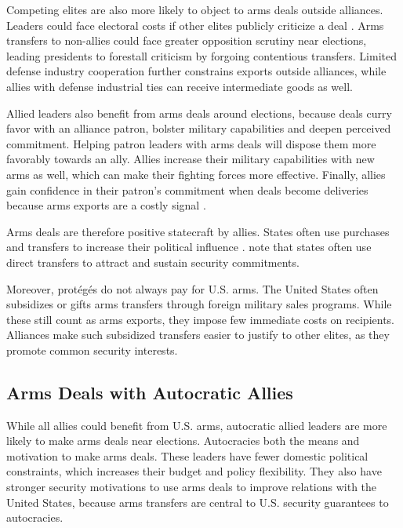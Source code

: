 \documentclass[12pt]{article}
\begin{document}
Competing elites are also more likely to object to arms deals outside alliances.
Leaders could face electoral costs if other elites publicly criticize a deal \citep{Saunders2022}.
Arms transfers to non-allies could face greater opposition scrutiny near elections, leading presidents to forestall criticism by forgoing contentious transfers.
Limited defense industry cooperation further constrains exports outside alliances, while allies with defense industrial ties can receive intermediate goods as well.


Allied leaders also benefit from arms deals around elections, because deals curry favor with an alliance patron, bolster military capabilities and deepen perceived commitment.
Helping patron leaders with arms deals will dispose them more favorably towards an ally. 
Allies increase their military capabilities with new arms as well, which can make their fighting forces more effective. 
Finally, allies gain confidence in their patron's commitment when deals become deliveries because arms exports are a costly signal \citep{McManusYarhi-Milo2017}.


Arms deals are therefore positive statecraft by allies. 
States often use purchases and transfers to increase their political influence \citep[pg. 42-3]{Baldwin2020}.
\citet[pg. 184-5]{IkenberryGrieco2003} note that states often use direct transfers to attract and sustain security commitments.  


Moreover, prot{\'e}g{\'e}s do not always pay for U.S. arms.
The United States often subsidizes or gifts arms transfers through foreign military sales programs. 
While these still count as arms exports, they impose few immediate costs on recipients.
Alliances make such subsidized transfers easier to justify to other elites, as they promote common security interests. 


\subsection{Arms Deals with Autocratic Allies}


While all allies could benefit from U.S. arms, autocratic allied leaders are more likely to make arms deals near elections. 
Autocracies both the means and motivation to make arms deals.
These leaders have fewer domestic political constraints, which increases their budget and policy flexibility. 
They also have stronger security motivations to use arms deals to improve relations with the United States, because arms transfers are central to U.S. security guarantees to autocracies.
\end{document}
